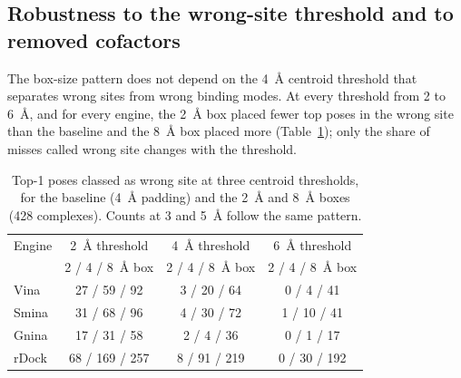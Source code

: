 \subsection{Robustness to the wrong-site threshold and to removed cofactors}
\label{sec:robustness}

The box-size pattern does not depend on the \SI{4}{\angstrom} centroid threshold that
separates wrong sites from wrong binding modes. At every threshold from 2 to
\SI{6}{\angstrom}, and for every engine, the \SI{2}{\angstrom} box placed fewer top poses in
the wrong site than the baseline and the \SI{8}{\angstrom} box placed more
(Table~\ref{tab:threshold}); only the share of misses called wrong site changes with the
threshold.

\begin{table}[h]
  \centering
  \caption{Top-1 poses classed as wrong site at three centroid thresholds, for the baseline
    (\SI{4}{\angstrom} padding) and the \SI{2}{\angstrom} and \SI{8}{\angstrom} boxes (428
    complexes). Counts at 3 and \SI{5}{\angstrom} follow the same pattern.}
  \label{tab:threshold}
  \small
  \begin{tabular}{lccc}
    \toprule
    Engine & \SI{2}{\angstrom} threshold & \SI{4}{\angstrom} threshold & \SI{6}{\angstrom} threshold \\
     & 2 / 4 / \SI{8}{\angstrom} box & 2 / 4 / \SI{8}{\angstrom} box & 2 / 4 / \SI{8}{\angstrom} box \\
    \midrule
    Vina & 27 / 59 / 92 & 3 / 20 / 64 & 0 / 4 / 41 \\
    Smina & 31 / 68 / 96 & 4 / 30 / 72 & 1 / 10 / 41 \\
    Gnina & 17 / 31 / 58 & 2 / 4 / 36 & 0 / 1 / 17 \\
    rDock & 68 / 169 / 257 & 8 / 91 / 219 & 0 / 30 / 192 \\
    \bottomrule
  \end{tabular}
\end{table}

